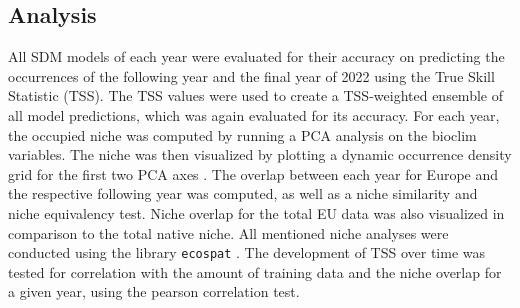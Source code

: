 \documentclass[12pt,a4paper]{article}
\begin{document}
\subsection{Analysis}
All SDM models of each year were evaluated for their accuracy on predicting the occurrences of the following year and the final year of 2022 using the True Skill Statistic (TSS).
The TSS values were used to create a TSS-weighted ensemble of all model predictions, which was again evaluated for its accuracy.
For each year, the occupied niche was computed by running a PCA analysis on the bioclim variables.
The niche was then visualized by plotting a dynamic occurrence density grid for the first two PCA axes \autocite{broennimann2012niche}.
The overlap between each year for Europe and the respective following year was computed, as well as a niche similarity and niche equivalency test.
Niche overlap for the total EU data was also visualized in comparison to the total native niche.
All mentioned niche analyses were conducted using the library \texttt{ecospat} \autocite{dicola2017ecospat}.
The development of TSS over time was tested for correlation with the amount of training data and the niche overlap for a given year, using the pearson correlation test.



\newpage
\printbibliography[]

\end{document}
